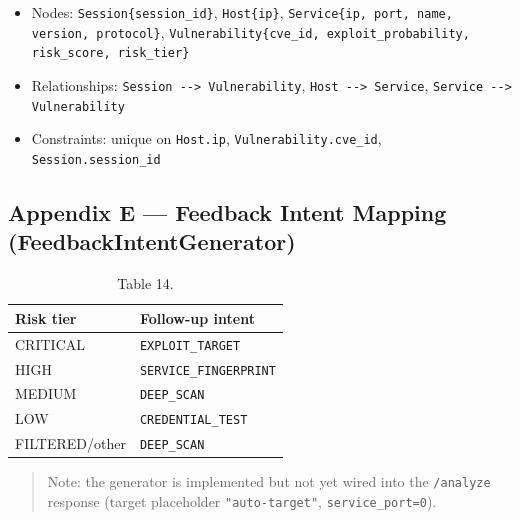 \documentclass[10pt,journal,onecolumn]{IEEEtran}
\begin{document}
\begin{itemize}
\item Nodes: \texttt{Session\{session\_id\}}, \texttt{Host\{ip\}}, \texttt{Service\{ip, port, name, version, protocol\}}, \texttt{Vulnerability\{cve\_\allowbreak id, exploit\_\allowbreak probability, risk\_\allowbreak score, risk\_\allowbreak tier\}}
\item Relationships: \texttt{Session --\allowbreak > Vulnerability}, \texttt{Host --\allowbreak > Service}, \texttt{Service --\allowbreak > Vulnerability}
\item Constraints: unique on \texttt{Host.ip}, \texttt{Vulnerability.cve\_id}, \texttt{Session.session\_id}
\end{itemize}

\subsection{Appendix E --- Feedback Intent Mapping (FeedbackIntentGenerator)}

\begin{table}[h]
\caption{Table 14.}
\label{tab:t14}
\begin{tabularx}{\columnwidth}{l >{\raggedright\arraybackslash}X}
\toprule
\textbf{Risk tier} & \textbf{Follow-up intent}\\
\midrule
CRITICAL & \texttt{EXPLOIT\_TARGET}\\
HIGH & \texttt{SERVICE\_FINGERPRINT}\\
MEDIUM & \texttt{DEEP\_SCAN}\\
LOW & \texttt{CREDENTIAL\_TEST}\\
FILTERED/other & \texttt{DEEP\_SCAN}\\
\bottomrule
\end{tabularx}
\end{table}

\begin{quote}\small Note: the generator is implemented but not yet wired into the \texttt{/analyze} response (target placeholder \texttt{"auto-target"}, \texttt{service\_port=0}).\end{quote}
\end{document}
